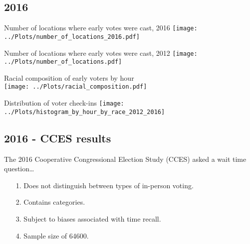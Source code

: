 \documentclass{beamer}
\begin{document}
		\subsection{2016}
		
		
		\begin{frame}				
		\end{frame}
		
		\begin{frame}				
		\centering 
		Number of locations where early votes were cast, 2016
		\texttt{[image: ../Plots/number\_of\_locations\_2016.pdf]}
		\end{frame}
		
		\begin{frame}				
		\centering 
		Number of locations where early votes were cast, 2012
		\texttt{[image: ../Plots/number\_of\_locations.pdf]}
		\end{frame}

		\begin{frame}			
			\centering 
			Racial composition of early voters by hour	\\
			\texttt{[image: ../Plots/racial\_composition.pdf]}
		\end{frame}

		\begin{frame}				
			\centering 
			Distribution of voter check-ins
		\texttt{[image: ../Plots/histogram\_by\_hour\_by\_race\_2012\_2016]}
		\end{frame}

		\subsection{2016 - CCES results}
		
		\begin{frame}
                  The 2016 Cooperative Congressional Election Study
                  (CCES) asked a wait time question\ldots
			\begin{itemize}
				\item[1.] Does not distinguish between
                                  types of in-person voting.
				\item[2.] Contains categories.
				\item[3.] Subject to biases associated
                                  with time recall.
				\item[4.] Sample size of 64600.
			\end{itemize}
		\end{frame}
\end{document}
